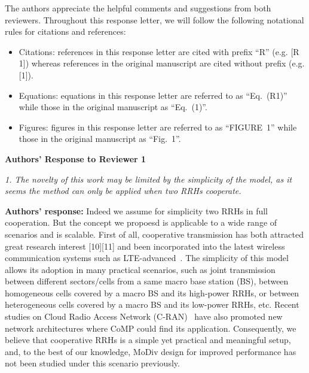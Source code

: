 \documentclass[onecolumn, 11pt, draftclsnofoot]{IEEEtran}
\begin{document}
The authors appreciate the helpful comments and suggestions from both reviewers. 
Throughout this response letter, we will follow the following notational
rules for citations and references:
\begin{itemize}
  \item Citations: references in this response letter are cited with prefix
  ``R'' (e.g. [R 1]) whereas references in the original manuscript are cited
  without prefix (e.g. [1]).
  \item Equations: equations in this response letter are referred to as
  ``Eq.~(R1)''  while those in the original manuscript as ``Eq.~(1)''.
  \item Figures: figures in this response letter are referred to as
  ``FIGURE~1''  while those in the original manuscript as ``Fig.~1''.
\end{itemize}

\begin{center}
  {\LARGE \textbf{Authors' Response to Reviewer 1}}
\end{center}


 
\noindent
\emph{1. The novelty of this work may be limited by the simplicity of the model,
as it seems the method can only be applied when two RRHs cooperate. }

\noindent \textbf{Authors' response:} 
Indeed we assume for simplicity two RRHs in full
cooperation. But the concept we propoesd is applicable to a wide range of
scenarios and is scalable. First of all, cooperative transmission has both
attracted great research interest [10][11] and been incorporated into the latest
wireless communication systems such as LTE-advanced~\citep[R][]{TR36.819}. The
simplicity of this model allows its adoption in many practical scenarios, such as
joint transmission between different sectors/cells from a same macro base
station (BS), between homogeneous cells covered by a macro BS and its high-power RRHs, 
or between heterogeneous cells covered by a macro BS and its low-power RRHs, etc. Recent studies 
on Cloud Radio Access Network
(C-RAN)~\citep[R][]{6897914}\citep[R][]{6923535} have also promoted new network architectures where CoMP could find its application.
Consequently, we believe that cooperative RRHs is a simple yet practical and
meaningful setup, and, to the best of our knowledge, MoDiv design for improved performance has not
been studied under this scenario previously.
\end{document}
